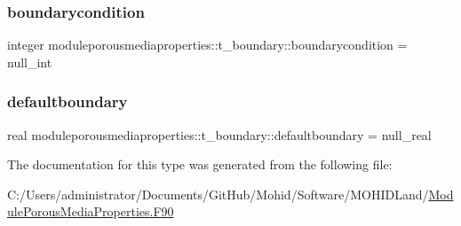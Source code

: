 \subsubsection{\texorpdfstring{boundarycondition}{boundarycondition}}
{\footnotesize\ttfamily integer moduleporousmediaproperties\+::t\+\_\+boundary\+::boundarycondition = null\+\_\+int\hspace{0.3cm}{\ttfamily [private]}}

\mbox{\label{structmoduleporousmediaproperties_1_1t__boundary_a35a3d3ec8f7216ca6d5f0e93b53d76dd}} 
\subsubsection{\texorpdfstring{defaultboundary}{defaultboundary}}
{\footnotesize\ttfamily real moduleporousmediaproperties\+::t\+\_\+boundary\+::defaultboundary = null\+\_\+real\hspace{0.3cm}{\ttfamily [private]}}



The documentation for this type was generated from the following file\+:\begin{DoxyCompactItemize}
\item 
C\+:/\+Users/administrator/\+Documents/\+Git\+Hub/\+Mohid/\+Software/\+M\+O\+H\+I\+D\+Land/\mbox{\hyperlink{_module_porous_media_properties_8_f90}{Module\+Porous\+Media\+Properties.\+F90}}\end{DoxyCompactItemize}

